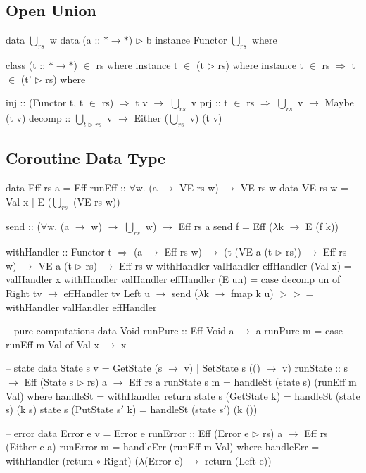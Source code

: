 \documentclass{article}
\newcommand{\hbind}{>\!\!\!>\!\!\!=}
\newcommand{\U}{\bigcup\nolimits}
\begin{document}
\subsection*{Open Union}
\begin{code}
data $\U_{rs}$ w
data (a :: $* \to *$) $\rhd$ b
instance Functor  $\U_{rs}$ where

class (t :: $* \to *$) $\in$ rs where
instance t $\in$ (t $\rhd$ rs) where
instance t $\in$ rs $\Rightarrow$ t $\in$ (t' $\rhd$ rs) where

inj :: (Functor t, t $\in$ rs) $\Rightarrow$ t v $\to$ $\U_{rs}$ v
prj :: t $\in$ rs $\Rightarrow$ $\U_{rs}$ v $\to$ Maybe (t v)
decomp :: $\U_{t \rhd rs}$ v $\to$ Either ($\U_{rs}$ v) (t v)
\end{code}

\subsection*{Coroutine Data Type}
\begin{code}
data Eff rs a = Eff { runEff :: $\forall$w. (a $\to$ VE rs w) $\to$ VE rs w }
data VE rs w = Val x
                     | E ($\U_{rs}$ (VE rs w))

send :: ($\forall$w. (a $\to$ w) $\to$ $\U_{rs}$ w) $\to$ Eff rs a
send f = Eff ($\lambda$k $\to$ E (f k))

withHandler :: Functor t
                $\Rightarrow$ (a $\to$ Eff rs w)
                $\to$ (t (VE a (t $\rhd$ rs)) $\to$ Eff rs w)
                $\to$ VE a (t $\rhd$ rs)
                $\to$ Eff rs w
withHandler valHandler effHandler (Val x) = valHandler x
withHandler valHandler effHandler (E un) = case decomp un of
    Right tv $\to$ effHandler tv
    Left u $\to$ send ($\lambda$k $\to$ fmap k u) $\hbind$ withHandler valHandler effHandler

-- pure computations
data Void
runPure :: Eff Void a $\to$ a
runPure m = case runEff m Val of
  Val x $\to$ x

-- state
data State s v = GetState (s $\to$ v)
                     | SetState s (() $\to$ v)
runState :: s $\to$ Eff (State s $\rhd$ rs) a $\to$ Eff rs a
runState s m = handleSt (state s) (runEff m Val) where
    handleSt = withHandler return
    state s (GetState k) = handleSt (state s) (k s)
    state s (PutState s$'$ k) = handleSt (state s$'$) (k ())

-- error
data Error e v = Error e
runError :: Eff (Error e $\rhd$ rs) a $\to$ Eff rs (Either e a)
runError m = handleErr (runEff m Val) where
    handleErr = withHandler (return $\circ$ Right) ($\lambda$(Error e) $\to$ return (Left e))
\end{code}
\end{document}
